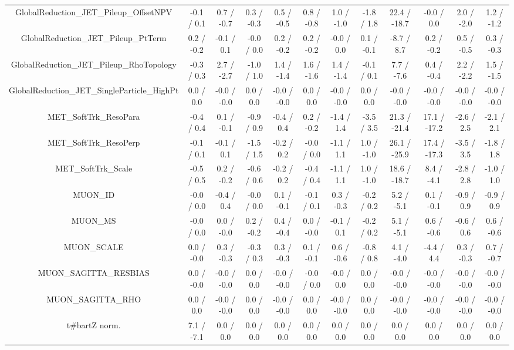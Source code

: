 \begin{table}[htbp]
\begin{center}
\begin{tabular}{|c|c|c|c|c|c|c|c|c|c|c|c|}
  GlobalReduction_JET_Pileup_OffsetNPV & -0.1 / 0.1 & 0.7 / -0.7 & 0.3 / -0.3 & 0.5 / -0.5 & 0.8 / -0.8 & 1.0 / -1.0 & -1.8 / 1.8 & 22.4 / -18.7 & -0.0 / 0.0 & 2.0 / -2.0 & 1.2 / -1.2 \\ 
  GlobalReduction_JET_Pileup_PtTerm & 0.2 / -0.2 & -0.1 / 0.1 & -0.0 / 0.0 & 0.2 / -0.2 & 0.2 / -0.2 & -0.0 / 0.0 & 0.1 / -0.1 & -8.7 / 8.7 & 0.2 / -0.2 & 0.5 / -0.5 & 0.3 / -0.3 \\ 
  GlobalReduction_JET_Pileup_RhoTopology & -0.3 / 0.3 & 2.7 / -2.7 & -1.0 / 1.0 & 1.4 / -1.4 & 1.6 / -1.6 & 1.4 / -1.4 & -0.1 / 0.1 & 7.7 / -7.6 & 0.4 / -0.4 & 2.2 / -2.2 & 1.5 / -1.5 \\ 
  GlobalReduction_JET_SingleParticle_HighPt & 0.0 / 0.0 & -0.0 / -0.0 & 0.0 / 0.0 & -0.0 / -0.0 & 0.0 / 0.0 & -0.0 / -0.0 & 0.0 / 0.0 & -0.0 / -0.0 & -0.0 / -0.0 & -0.0 / -0.0 & -0.0 / -0.0 \\ 
  MET_SoftTrk_ResoPara & -0.4 / 0.4 & 0.1 / -0.1 & -0.9 / 0.9 & -0.4 / 0.4 & 0.2 / -0.2 & -1.4 / 1.4 & -3.5 / 3.5 & 21.3 / -21.4 & 17.1 / -17.2 & -2.6 / 2.5 & -2.1 / 2.1 \\ 
  MET_SoftTrk_ResoPerp & -0.1 / 0.1 & -0.1 / 0.1 & -1.5 / 1.5 & -0.2 / 0.2 & -0.0 / 0.0 & -1.1 / 1.1 & 1.0 / -1.0 & 26.1 / -25.9 & 17.4 / -17.3 & -3.5 / 3.5 & -1.8 / 1.8 \\ 
  MET_SoftTrk_Scale & -0.5 / 0.5 & 0.2 / -0.2 & -0.6 / 0.6 & -0.2 / 0.2 & -0.4 / 0.4 & -1.1 / 1.1 & 1.0 / -1.0 & 18.6 / -18.7 & 8.4 / -4.1 & -2.8 / 2.8 & -1.0 / 1.0 \\ 
  MUON_ID & -0.0 / 0.0 & -0.4 / 0.4 & -0.0 / 0.0 & 0.1 / -0.1 & -0.1 / 0.1 & 0.3 / -0.3 & -0.2 / 0.2 & 5.2 / -5.1 & 0.1 / -0.1 & -0.9 / 0.9 & -0.9 / 0.9 \\ 
  MUON_MS & -0.0 / 0.0 & 0.0 / -0.0 & 0.2 / -0.2 & 0.4 / -0.4 & 0.0 / -0.0 & -0.1 / 0.1 & -0.2 / 0.2 & 5.1 / -5.1 & 0.6 / -0.6 & -0.6 / 0.6 & 0.6 / -0.6 \\ 
  MUON_SCALE & 0.0 / -0.0 & 0.3 / -0.3 & -0.3 / 0.3 & 0.3 / -0.3 & 0.1 / -0.1 & 0.6 / -0.6 & -0.8 / 0.8 & 4.1 / -4.0 & -4.4 / 4.4 & 0.3 / -0.3 & 0.7 / -0.7 \\ 
  MUON_SAGITTA_RESBIAS & 0.0 / -0.0 & -0.0 / -0.0 & 0.0 / 0.0 & -0.0 / -0.0 & -0.0 / 0.0 & -0.0 / 0.0 & 0.0 / 0.0 & -0.0 / -0.0 & -0.0 / -0.0 & -0.0 / -0.0 & -0.0 / -0.0 \\ 
  MUON_SAGITTA_RHO & 0.0 / 0.0 & -0.0 / -0.0 & 0.0 / 0.0 & -0.0 / -0.0 & 0.0 / 0.0 & -0.0 / -0.0 & 0.0 / 0.0 & -0.0 / -0.0 & -0.0 / -0.0 & -0.0 / -0.0 & -0.0 / -0.0 \\ 
  t#bar{t}Z norm. & 7.1 / -7.1 & 0.0 / 0.0 & 0.0 / 0.0 & 0.0 / 0.0 & 0.0 / 0.0 & 0.0 / 0.0 & 0.0 / 0.0 & 0.0 / 0.0 & 0.0 / 0.0 & 0.0 / 0.0 & 0.0 / 0.0 \\ 

\end{tabular}
\end{center}
\end{table}
